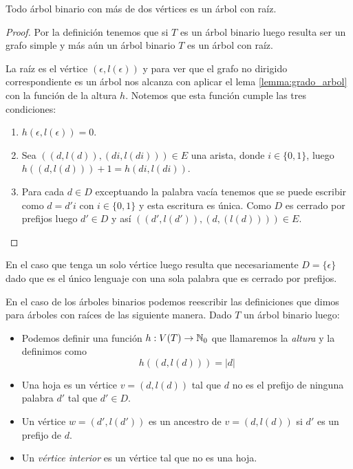 \documentclass[tesis.tex]{subfiles}
\begin{document}
\begin{leoenv}
\begin{prop}
	Todo árbol binario con más de dos vértices es un árbol con raíz.
\end{prop}

\begin{proof}
	Por la definición tenemos que si $T$ es un árbol binario luego resulta ser un grafo simple y más aún un árbol binario $T$ es un árbol con raíz.
	
	La raíz es el vértice $(\epsilon, l(\epsilon))$ y para ver que el grafo no dirigido correspondiente es un árbol nos alcanza con aplicar el lema \ref{lemma:grado_arbol} con la función de la altura $h$.
	Notemos que esta función cumple las tres condiciones:
	\begin{enumerate}
		\item $h(\epsilon,l(\epsilon)) = 0$.
		\item Sea $((d,l(d)),(di,l(di))) \in E$ una arista, donde $i \in \{0,1\}$, 
		luego $h((d,l(d)))+1 = h(di,l(di))$.
		\item Para cada $d \in D$ exceptuando la palabra vacía tenemos que se puede escribir como $d = d'i$ con $i \in \{0,1\}$ y esta escritura es única. 
		Como $D$ es cerrado por prefijos luego $d' \in D$ y así $((d',l(d')),(d,(l(d)))) \in E$.
	\end{enumerate}
\end{proof}

\begin{obs}
	En el caso que tenga un solo vértice luego resulta que necesariamente $D = \{ \epsilon \}$ dado que es el único lenguaje con una sola palabra que es cerrado por prefijos.
\end{obs}

En el caso de los árboles binarios podemos reescribir las definiciones que dimos para árboles con raíces de las siguiente manera.
Dado $T$ un árbol binario luego:
\begin{itemize}
	\item Podemos definir una función $h:V(T) \to \mathbb{N}_{0}$ que llamaremos la \emph{altura } y la definimos como
		\[
			h((d,l(d))) = |d|
		\]
	\item Una hoja es un vértice $v = (d,l(d))$ tal que $d$ no es el prefijo de ninguna palabra $d'$ tal que $d' \in D$.
	\item Un vértice $w = (d',l(d'))$ es un ancestro de $v = (d,l(d))$ si $d'$ es un prefijo de $d$.
	\item Un \emph{vértice interior} es un vértice tal que no es una hoja.
\end{itemize}


\end{leoenv}
\end{document}
